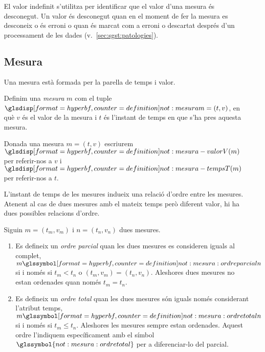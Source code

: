 El valor indefinit s'utilitza per identificar que el valor d'una
mesura és desconegut. Un valor és desconegut quan en el moment de fer
la mesura es desconeix o és erroni o quan és marcat com a erroni o
descartat després d'un processament de les dades
(v.~\autoref{sec:sgst:patologies}).





\subsection{Mesura}\label{sec:model:mesura} 

Una mesura està formada per la parella de temps i valor.

\begin{definition}[Mesura]
  \label{def:model:mesura}
  Definim una \emph{mesura} $m$ com el tuple
  $\glsdispdef{not:mesura}{m=(t,v)}$, en què $v$ és el valor de la
  mesura i $t$ és l'instant de temps en que s'ha pres aquesta mesura.
\end{definition}


Donada una mesura $m=(t,v)$ escriurem
$\glsdispdef{not:mesura-valor}{V(m)}$ per referir-nos a $v$ i
$\glsdispdef{not:mesura-temps}{T(m)}$ per referir-nos a $t$.


L'instant de temps de les mesures indueix una relació d'ordre
entre les mesures. Atenent al cas de dues mesures amb el mateix temps
però diferent valor, hi ha dues possibles relacions d'ordre.
\begin{definition}
  \label{def:model:mesura-relacio-ordre}
  Siguin $m=(t_m,v_m)$ i $n=(t_n,v_n)$ dues mesures.

  \begin{enumerate}
  \item Es defineix un \emph{ordre parcial} quan les dues mesures es
    consideren iguals al complet, $m
    \glssymboldef{not:mesura:ordreparcial} n$ si i només si $t_m <
    t_n$ o $(t_m, v_m) = (t_n, v_n)$. Aleshores dues mesures no estan
    ordenades quan només $t_m = t_n$.

  \item Es defineix un \emph{ordre total} quan les dues mesures són
    iguals només considerant l'atribut temps,
    $m\glssymboldef{not:mesura:ordretotal} n$ si i només si $t_m\leq
    t_n$. Aleshores les mesures sempre estan ordenades.  Aquest ordre
    l'indiquem específicament amb el símbol
    $\glssymbol{not:mesura:ordretotal}$ per a diferenciar-lo del
    parcial.
  \end{enumerate}
\end{definition}

